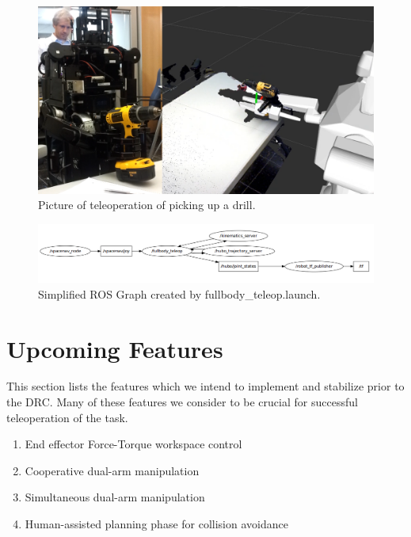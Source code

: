 \documentclass[letterpaper, 10 pt]{report}
\begin{document}
  \begin{figure}[ht]
    \centering
    \includegraphics[width=12.0cm]{figures/pickup-drill-rviz}
    \caption{Picture of teleoperation of picking up a drill.}
    \label{fig:pickup-drill-rviz-image}
  \end{figure}
  \begin{figure}[ht]
    \centering
    \includegraphics[width=12.0cm]{figures/teleop-rosgraph}
    \caption{Simplified ROS Graph created by fullbody\_teleop.launch.}
    \label{fig:teleop-rosgraph-image}
  \end{figure}

%
\pagebreak
\section{Upcoming Features}
This section lists the features which we intend to implement and stabilize prior to the DRC. Many of these
features we consider to be crucial for successful teleoperation of the task.

\begin{enumerate}
  \item End effector Force-Torque workspace control
  \item Cooperative dual-arm manipulation
  \item Simultaneous dual-arm manipulation
  \item Human-assisted planning phase for collision avoidance
\end{enumerate}


%
\clearpage
\end{document}
